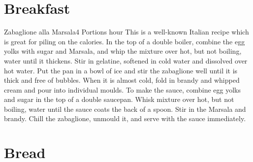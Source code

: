 \documentclass[letterpaper]{book}
\begin{document}
\pagestyle{empty}
\hbox{}\cleardoublepage
\pagestyle{plain}
\tableofcontents
\cleardoublepage
{}
\pagestyle{headings}


\chapter{Breakfast}

\begin{recipe}{Zabaglione alla Marsala}{4 Portions}{ hour}
\freeform This is a well-known Italian recipe which is
great for piling on the calories.
In the top of a double boiler, combine the egg yolks with sugar and
Marsala, and whip the mixture over hot, but not boiling, water until it
thickens. Stir in gelatine, softened in cold water and dissolved over hot
water.
Put the pan in a bowl of ice and stir the
zabaglione well until it is thick and free of bubbles. When it is almost
cold, fold in brandy and whipped cream and pour into individual moulds.
To make the sauce, combine egg yolks and sugar in the top of a double
saucepan. Whisk mixture over hot, but not boiling, water until the
sauce coats the back of a spoon. Stir in the Marsala and brandy.
\newstep
Chill the zabaglione, unmould it, and serve with the sauce immediately.
\end{recipe}\newpage

\chapter{Bread}


\clearpage
\hbox{}\clearpage\hbox{}\cleardoublepage
\end{document}
